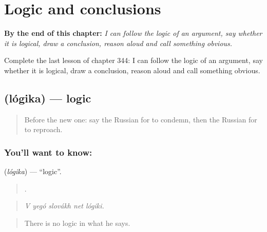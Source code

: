 
\chapter{Logic and conclusions}
\label{ch:ru-logic-and-conclusions}

\begin{chapteropening}
\textbf{By the end of this chapter:} \emph{I can follow the logic of an argument, say whether it is logical, draw a conclusion, reason aloud and call something obvious.}

Complete the last lesson of chapter 344: I can follow the logic of an argument, say whether it is logical, draw a conclusion, reason aloud and call something obvious.
\end{chapteropening}

\section[\texorpdfstring{\ru{логика} (lógika)}{логика (lógika)}]{ (lógika) — logic}

\label{lesson:RU-C344-logika}



\begin{quote}
Before the new one: say the Russian for to condemn, then the Russian for to reproach.
\end{quote}

\subsection*{You'll want to know: }
\textbf{} (\emph{lógika}) — \textquotedblleft{}logic\textquotedblright{}.

\begin{quote}
    .
\end{quote}

\begin{quote}
\emph{V yegó slovákh net lógiki.}
\end{quote}

\begin{quote}
There is no logic in what he says.
\end{quote}

